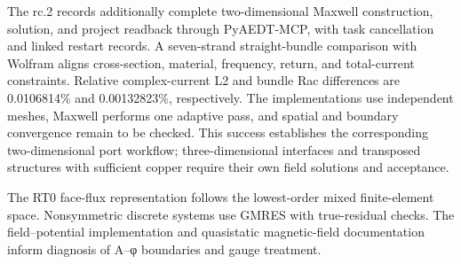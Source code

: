 \hypertarget{S2.ansys.rc2}{}
The rc.2 records additionally complete two-dimensional Maxwell construction, solution, and project readback through PyAEDT-MCP, with task cancellation and linked restart records. A seven-strand straight-bundle comparison with Wolfram aligns cross-section, material, frequency, return, and total-current constraints. Relative complex-current L2 and bundle Rac differences are 0.0106814\% and 0.00132823\%, respectively. The implementations use independent meshes, Maxwell performs one adaptive pass, and spatial and boundary convergence remain to be checked. This success establishes the corresponding two-dimensional port workflow; three-dimensional interfaces and transposed structures with sufficient copper require their own field solutions and acceptance. \cite{PYAEDTMCP,PYAEDT}

\hypertarget{S2.method.sources}{}
The RT0 face-flux representation follows the lowest-order mixed finite-element space. Nonsymmetric discrete systems use GMRES with true-residual checks. The field–potential implementation and quasistatic magnetic-field documentation inform diagnosis of A–φ boundaries and gauge treatment. \cite{RT1977,GMRES1986,FEMDOC}
